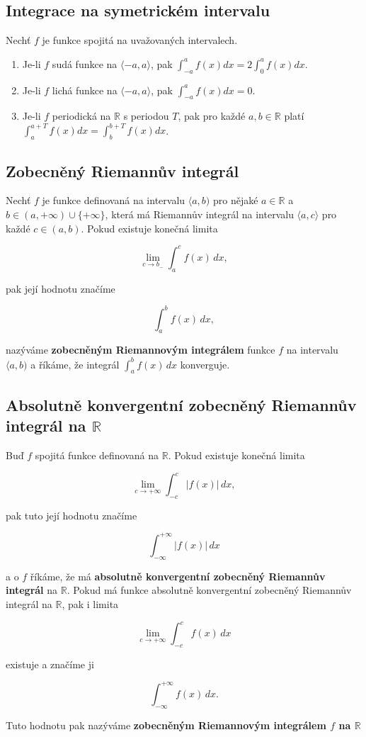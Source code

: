 \subsection*{Integrace na symetrickém intervalu}

Nechť $f$ je funkce spojitá na uvažovaných intervalech.

\begin{enumerate}
    \item Je-li $f$ sudá funkce na $\langle -a,a \rangle$, pak $\displaystyle\int_{-a}^a
              f(x) dx = 2 \int_0^a f(x) dx$.
    \item Je-li $f$ lichá funkce na $\langle -a,a \rangle$, pak $\displaystyle\int_{-a}^a
              f(x) dx = 0$.
    \item Je-li $f$ periodická na $\mathbb{R}$ s periodou $T$, pak pro každé
          $a,b\in\mathbb{R}$ platí $\displaystyle\int_a^{a+T} f(x)dx = \int_b^{b+T} f(x)
              dx$.
\end{enumerate}

\subsection*{Zobecněný Riemannův integrál}

Nechť $f$ je funkce definovaná na intervalu $\langle a, b)$ pro nějaké $a \in
    \mathbb{R}$ a $b \in (a, +\infty) \cup \{+\infty\}$, která má Riemannův
integrál na intervalu $\langle a, c \rangle$ pro každé $c \in (a,b)$. Pokud
existuje konečná limita

\[ \lim_{c \to b_-} \int_a^c f(x)\, dx, \]

\noindent pak její hodnotu značíme

\[ \int_a^b f(x)\, dx, \]

\noindent nazýváme \textbf{zobecněným Riemannovým integrálem} funkce $f$ na intervalu $\langle a, b)$ a říkáme, že integrál $\int_a^b f(x)\, dx$ konverguje.

\subsection*{Absolutně konvergentní zobecněný Riemannův integrál na $\mathbb{R}$}

Buď $f$ spojitá funkce definovaná na $\mathbb{R}$. Pokud existuje konečná
limita

\[ \lim_{c\to+\infty} \int_{-c}^{c} |f(x)| \,dx, \]

\noindent pak tuto její hodnotu značíme

\[ \int_{-\infty}^{+\infty} |f(x)| \,dx \]

\noindent a o $f$ říkáme, že má \textbf{absolutně konvergentní zobecněný Riemannův integrál} na $\mathbb{R}$.
Pokud má funkce absolutně konvergentní zobecněný Riemannův integrál na $\mathbb{R}$, pak i limita

\[ \lim_{c\to+\infty} \int_{-c}^{c} f(x) \,dx \]

\noindent existuje a značíme ji

\[ \int_{-\infty}^{+\infty} f(x)\,dx. \]

\noindent Tuto hodnotu pak nazýváme \textbf{zobecněným Riemannovým integrálem $f$ na $\mathbb{R}$}

\pagebreak
